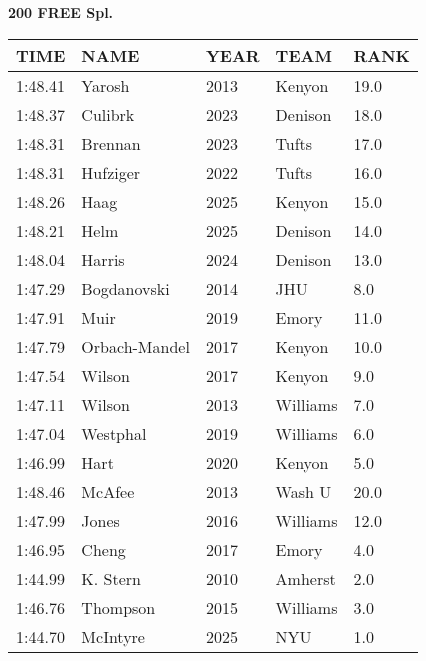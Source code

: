 \begin{center}
\begin{minipage}[t]{0.7\textwidth}
\centering
\textbf{200 FREE Spl.}\\[0.05cm]
\begin{tabular}{@{}p{1.8cm}p{2.8cm}p{1.2cm}p{1.4cm}p{0.8cm}@{}}
\hline
\textbf{TIME} & \textbf{NAME} & \textbf{YEAR} & \textbf{TEAM} & \textbf{RANK} \\
\hline
1:48.41 & Yarosh & 2013 & Kenyon & 19.0 \\
1:48.37 & Culibrk & 2023 & Denison & 18.0 \\
1:48.31 & Brennan & 2023 & Tufts & 17.0 \\
1:48.31 & Hufziger & 2022 & Tufts & 16.0 \\
1:48.26 & Haag & 2025 & Kenyon & 15.0 \\
1:48.21 & Helm & 2025 & Denison & 14.0 \\
1:48.04 & Harris & 2024 & Denison & 13.0 \\
1:47.29 & Bogdanovski & 2014 & JHU & 8.0 \\
1:47.91 & Muir & 2019 & Emory & 11.0 \\
1:47.79 & Orbach-Mandel & 2017 & Kenyon & 10.0 \\
1:47.54 & Wilson & 2017 & Kenyon & 9.0 \\
1:47.11 & Wilson & 2013 & Williams & 7.0 \\
1:47.04 & Westphal & 2019 & Williams & 6.0 \\
1:46.99 & Hart & 2020 & Kenyon & 5.0 \\
1:48.46 & McAfee & 2013 & Wash U & 20.0 \\
1:47.99 & Jones & 2016 & Williams & 12.0 \\
1:46.95 & Cheng & 2017 & Emory & 4.0 \\
1:44.99 & K. Stern & 2010 & Amherst & 2.0 \\
1:46.76 & Thompson & 2015 & Williams & 3.0 \\
1:44.70 & McIntyre & 2025 & NYU & 1.0 \\
\hline
\end{tabular}
\end{minipage}
\end{center}

\vspace{0.4cm}

